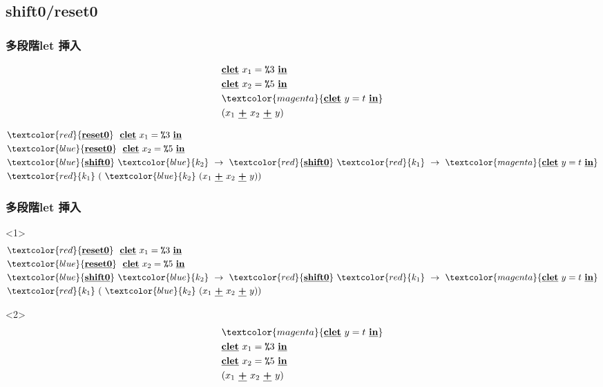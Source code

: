 \documentclass[dvipdfmx,cjk,xcolor=dvipsnames,envcountsect,notheorems,12pt]{beamer}
\newcommand\cResetz{\underline{\textbf{reset0}}}
\newcommand\cShiftz{\underline{\textbf{shift0}}}
\newcommand\cPlus{\underline{\textbf{+}}}
\newcommand\cLet{\underline{\textbf{clet}}}
\newcommand\cIn{\underline{\textbf{in}}}
\newcommand\csp[1]{\texttt{\%}{#1}}
\newcommand\red[1]{\textcolor{red}{#1}}
\newcommand\magenta[1]{\textcolor{magenta}{#1}}
\newcommand\blue[1]{\textcolor{blue}{#1}}
\theoremstyle{definition}
\begin{document}
\subsection{shift0/reset0}

\begin{frame}[fragile]
  \frametitle{多段階let 挿入}
  \begin{align*}
    & \cLet~x_1=\csp{3}~\cIn \\
    & \cLet~x_2=\csp{5}~\cIn \\
    & \magenta{\cLet~y=t~\cIn} \\
    & (x_1~\cPlus~x_2~\cPlus~y)
  \end{align*}

  \pause

  \begin{align*}
    & \red{\cResetz} ~~\cLet~x_1=\csp{3}~\cIn \\
    & \blue{\cResetz} ~~\cLet~x_2=\csp{5}~\cIn \\
    & \blue{\cShiftz}~\blue{k_2}~\to~ \red{\cShiftz}~\red{k_1}~\to~ \magenta{\cLet~y=t~\cIn} \\
    & \red{k_1}~(~\blue{k_2}~(x_1~\cPlus~x_2~\cPlus~y))
  \end{align*}
\end{frame}

\begin{frame}[fragile]
  \frametitle{多段階let 挿入}
  \begin{onlyenv}<1>
    \begin{align*}
      & \red{\cResetz} ~~\cLet~x_1=\csp{3}~\cIn \\
      & \blue{\cResetz} ~~\cLet~x_2=\csp{5}~\cIn \\
      & \blue{\cShiftz}~\blue{k_2}~\to~ \red{\cShiftz}~\red{k_1}~\to~ \magenta{\cLet~y=t~\cIn} \\
      & \red{k_1}~(~\blue{k_2}~(x_1~\cPlus~x_2~\cPlus~y))
    \end{align*}
  \end{onlyenv}

  \begin{onlyenv}<2>
    \begin{align*}
      & \magenta{\cLet~y=t~\cIn} \\
      & \cLet~x_1=\csp{3}~\cIn \\
      & \cLet~x_2=\csp{5}~\cIn \\
      & (x_1~\cPlus~x_2~\cPlus~y)
    \end{align*}
  \end{onlyenv}
\end{frame}
\end{document}
